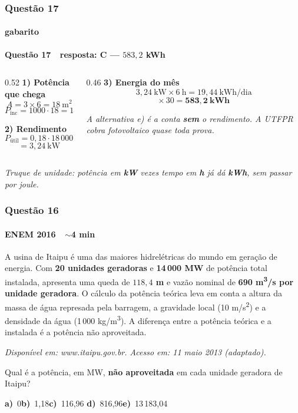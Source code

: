 \documentclass[aspectratio=169,12pt]{beamer}
\newcommand{\alternativascurtas}[5]{%
  \par\vspace{0.7em}%
  \noindent\textbf{a)}~#1\hfill\textbf{b)}~#2\hfill\textbf{c)}~#3%
  \hfill\textbf{d)}~#4\hfill\textbf{e)}~#5\par}
\newcommand{\resposta}[2]{%
  \par\vspace{0.2em}
  {\Large\bfseries\color{vinho}Quest\~ao #1 \,\textemdash\, resposta: #2}
  \par\vspace{0.6em}}
\begin{document}
\begin{frame}
\frametitle{Quest\~ao 17}
\framesubtitle{gabarito}
\resposta{17}{C --- $583{,}2$ kWh}

\begin{columns}[T]
\begin{column}{0.52\textwidth}
\textbf{1) Pot\^encia que chega}
\[ A = 3\times 6 = 18\ \text{m}^2 \]
\[ P_{\text{inc}} = 1000\cdot 18 = 18\,000\ \text{W} \]

\textbf{2) Rendimento}
\[ P_{\text{\'util}} = 0{,}18\cdot 18\,000 = 3\,240\ \text{W} \]
\[ = 3{,}24\ \text{kW} \]
\end{column}
\begin{column}{0.46\textwidth}
\textbf{3) Energia do m\^es}
\[ 3{,}24\ \text{kW} \times 6\ \text{h} = 19{,}44\ \text{kWh/dia} \]
\[ \times\, 30 = \mathbf{583{,}2\ kWh} \]

\vspace{0.3em}
{\color{grafite}\itshape\small A alternativa e) \'e a conta
\textbf{sem} o rendimento. A UTFPR cobra fotovoltaico quase toda
prova.}
\end{column}
\end{columns}

\vspace{0.2em}
{\color{grafite}\itshape\small Truque de unidade: pot\^encia em
\textbf{kW} vezes tempo em \textbf{h} j\'a d\'a \textbf{kWh}, sem
passar por joule.}
\end{frame}

\begin{frame}
\frametitle{Quest\~ao 16}
\framesubtitle{ENEM 2016 \,\textperiodcentered\, $\sim$4 min}

\small
A usina de Itaipu \'e uma das maiores hidrel\'etricas do mundo em
gera\c{c}\~ao de energia. Com \textbf{20 unidades geradoras} e
\textbf{14\,000 MW} de pot\^encia total instalada, apresenta uma queda
de \textbf{$118{,}4$ m} e vaz\~ao nominal de
\textbf{690 m\textsuperscript{3}/s por unidade geradora}. O c\'alculo
da pot\^encia te\'orica leva em conta a altura da massa de \'agua
represada pela barragem, a gravidade local
(10 m/s\textsuperscript{2}) e a densidade da \'agua
(1\,000 kg/m\textsuperscript{3}). A diferen\c{c}a entre a pot\^encia
te\'orica e a instalada \'e a pot\^encia n\~ao aproveitada.

\vspace{0.2em}
{\scriptsize\itshape\color{grafite}\hfill Dispon\'ivel em:
www.itaipu.gov.br. Acesso em: 11 maio 2013 (adaptado).}

\vspace{0.3em}
Qual \'e a pot\^encia, em MW, \textbf{n\~ao aproveitada} em cada
unidade geradora de Itaipu?

\alternativascurtas{0}{1,18}{116,96}{816,96}{13\,183,04}
\end{frame}
\end{document}

